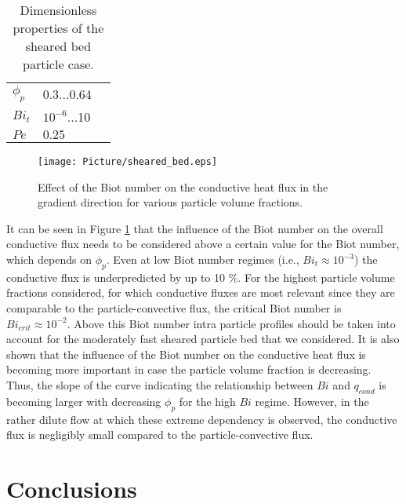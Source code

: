\documentclass{particles2015}
\begin{document}
\begin{table}[h]
  \centering 
  \caption{Dimensionless properties of the sheared bed particle case.}
   \begin{tabular}{llr}
      \hline 
        $\phi_p$				& 0.3...0.64 &\\
        $Bi_t$					& $10^{-6}$...10 & \\
        $Pe$ 					& $0.25$& \\
      \hline      
       \end{tabular}
   \setlength{\belowcaptionskip}{12pt}
   \label{tab:properties_sheard_bed}
\end{table}


\begin{figure}[h!]
   \centering
   \texttt{[image: Picture/sheared\_bed.eps]}
   \caption{Effect of the Biot number on the conductive heat flux in the gradient direction for various particle volume fractions.}
   \label{fig:sheared_bed}
\end{figure}

It can be seen in Figure \ref{fig:sheared_bed} that the influence of the Biot number on the overall conductive flux needs to be considered above a certain value for the Biot number, which depends on $\phi_p$. Even at low Biot number regimes (i.e., $Bi_t \approx 10^{-3}$) the conductive flux is underpredicted by up to 10 $\%$. For the highest particle volume fractions considered, for which conductive fluxes are most relevant since they are comparable to the particle-convective flux, the critical Biot number is $Bi_{crit} \approx 10^{-2}$. Above this Biot number intra particle profiles should be taken into account for the moderately fast sheared particle bed that we considered. It is also shown that the influence of the Biot number on the conductive heat flux is becoming more important in case the particle volume fraction is decreasing. Thus, the slope of the curve indicating the relationship between $Bi$ and $q_{cond}$ is becoming larger with decreasing $\phi_p$ for the high $Bi$ regime. However, in the rather dilute flow at which these extreme dependency is observed, the conductive flux is negligibly small compared to the particle-convective flux. 


\section{Conclusions}
\label{sec:conclusions}
\end{document}
